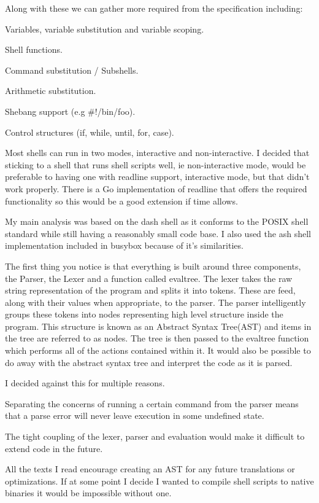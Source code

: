 Along with these we can gather more required from the specification including:
\begin{itemize*}
    \item Variables, variable substitution and variable scoping.
    \item Shell functions.
    \item Command substitution / Subshells.
    \item Arithmetic substitution.
    \item Shebang support (e.g \#!/bin/foo).
    \item Control structures (if, while, until, for, case).
\end{itemize*}

Most shells can run in two modes, interactive and non-interactive.
I decided that sticking to a shell that runs shell scripts well, ie non-interactive mode, would be preferable to having one with readline support, interactive mode, but that didn't work properly.
There is a Go implementation of readline that offers the required functionality\cite{GO-READLINE} so this would be a good extension if time allows.

My main analysis was based on the dash shell\cite{DASH} as it conforms to the POSIX shell standard\cite{POSIX-SHELL-STANDARD} while still having a reasonably small code base.
I also used the ash shell implementation included in busybox\cite{BUSYBOX} because of it's similarities.

The first thing you notice is that everything is built around three components, the Parser, the Lexer and a function called evaltree.
The lexer takes the raw string representation of the program and splits it into tokens.
These are feed, along with their values when appropriate, to the parser.
The parser intelligently groups these tokens into nodes representing high level structure inside the program.
This structure is known as an Abstract Syntax Tree(AST) and items in the tree are referred to as nodes.
The tree is then passed to the evaltree function which performs all of the actions contained within it.
It would also be possible to do away with the abstract syntax tree and interpret the code as it is parsed.

I decided against this for multiple reasons.
\begin{enumerate*}
	\item Separating the concerns of running a certain command from the parser means that a parse error will never leave execution in some undefined state.
	\item The tight coupling of the lexer, parser and evaluation would make it difficult to extend code in the future.
	\item All the texts I read encourage creating an AST for any future translations or optimizations. If at some point I decide I wanted to compile shell scripts to native binaries it would be impossible without one.
\end{enumerate*}

